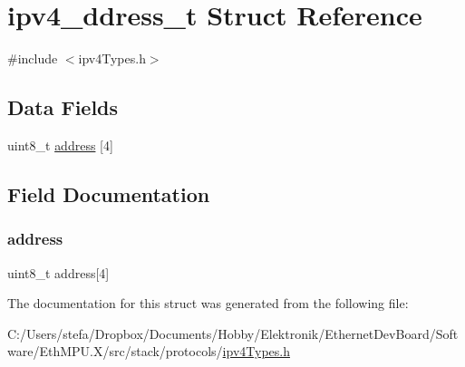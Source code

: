 \hypertarget{structipv4__ddress__t}{}\section{ipv4\+\_\+ddress\+\_\+t Struct Reference}
\label{structipv4__ddress__t}


{\ttfamily \#include $<$ipv4\+Types.\+h$>$}

\subsection*{Data Fields}
\begin{DoxyCompactItemize}
\item 
uint8\+\_\+t \mbox{\hyperlink{structipv4__ddress__t_addf23a7962e43c9ba2ed54c76bd937d3}{address}} \mbox{[}4\mbox{]}
\end{DoxyCompactItemize}


\subsection{Field Documentation}
\mbox{\label{structipv4__ddress__t_addf23a7962e43c9ba2ed54c76bd937d3}} 
\subsubsection{\texorpdfstring{address}{address}}
{\footnotesize\ttfamily uint8\+\_\+t address\mbox{[}4\mbox{]}}



The documentation for this struct was generated from the following file\+:\begin{DoxyCompactItemize}
\item 
C\+:/\+Users/stefa/\+Dropbox/\+Documents/\+Hobby/\+Elektronik/\+Ethernet\+Dev\+Board/\+Software/\+Eth\+M\+P\+U.\+X/src/stack/protocols/\mbox{\hyperlink{ipv4_types_8h}{ipv4\+Types.\+h}}\end{DoxyCompactItemize}
